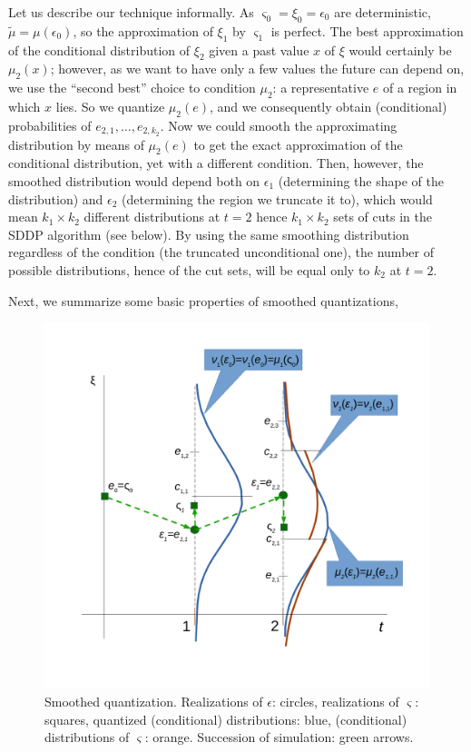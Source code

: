 \documentclass{article}              %
\begin{document}
\noindent Let us describe our technique informally. As $\varsigma_{0}=\xi_0=\epsilon_0$ are deterministic, $\tilde \mu=\mu(\epsilon_0)$, so the approximation of $\xi_1$ by $\varsigma_1$ is perfect. 
The best approximation of the conditional distribution of $\xi_2$ given a past value $x$ of $\xi$ would certainly be $\mu_2(x)$; however, as we want to have only a few values the future can depend on, we use the ``second best'' choice to condition $\mu_2$: a representative $e$ of a region in which $x$ lies. So we quantize $\mu_2(e)$, and we consequently obtain (conditional) probabilities of $e_{2,1},\dots,e_{2,k_2}$. Now we could smooth the approximating distribution by means of $\mu_2(e)$ to get the exact approximation of the conditional distribution, yet with a different condition. Then, however, the smoothed distribution would depend both on $\epsilon_1$ (determining the shape of the distribution) and $\epsilon_2$ (determining the region we truncate it to), which would mean $k_1 \times k_2$ different distributions at $t=2$ hence $k_1 \times k_2$ sets of cuts in the SDDP algorithm (see below). By using the same smoothing distribution regardless of the condition (the truncated unconditional one), the number of possible distributions, hence of the cut sets, will be equal only to $k_2$ at $t=2$.

Next, we summarize some basic properties of smoothed quantizations, 

\begin{figure}
\begin{center}
\includegraphics[scale=0.5]{illust}
\caption{Smoothed quantization. Realizations of $\epsilon$: circles, realizations of $\varsigma$: squares, quantized (conditional) distributions: blue, (conditional) distributions of $\varsigma$: orange. Succession of simulation: green arrows.}
\label{fig:ilust1}
\end{center}
\end{figure}
\end{document}
